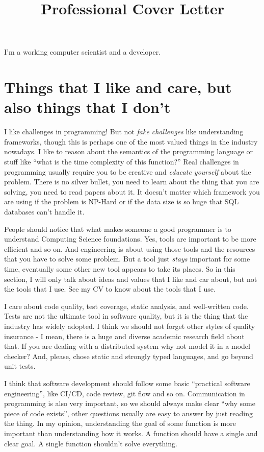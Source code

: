 \documentclass[11pt,a4paper,sans]{moderncv}
\title{Professional Cover Letter}
\begin{document}
\makecvtitle %
I'm a working computer scientist and a developer.

\section{Things that I like and care, but also things that I don't}
I like challenges in programming! But not \textit{fake challenges}
like understanding frameworks, though this is perhaps one of the most
valued things in the industry nowadays.  I like to reason about the
semantics of the programming language or stuff like ``what is the time
complexity of this function?''  Real challenges in programming usually
require you to be creative and \textit{educate yourself} about the
problem.  There is no silver bullet, you need to learn about the thing
that you are solving, you need to read papers about it. It doesn't matter
which framework you are using if the problem is NP-Hard or if the 
data size is so huge that SQL databases can't handle it.

People should notice that what makes someone a good programmer is to
understand Computing Science foundations.  Yes, tools are important to
be more efficient and so on.  And engineering is about using those
tools and the resources that you have to solve some problem.  But a
tool just \textit{stays} important for some time, eventually some other
new tool appears to take its places.  So in this section, I will only
talk about ideas and values that I like and car about, but not the
tools that I use.  See my CV to know about the tools that I use.

I care about code quality, test coverage, static analysis, and
well-written code. Tests are not the ultimate tool in software
quality, but it is the thing that the industry has widely adopted. I
think we should not forget other styles of quality insurance - I mean,
there is a huge and diverse academic research field about that.  If
you are dealing with a distributed system why not model it in a model
checker? And, please, chose static and strongly typed languages, and
go beyond unit tests.

I think that software development should follow some basic ``practical
software engineering'', like CI/CD, code review, git flow and so on.
Communication in programming is also very important, so we should
always make clear ``why some piece of code exists'', other questions
usually are easy to answer by just reading the thing. In my opinion,
understanding the goal of some function is more important than
understanding how it works. A function should have a single and clear
goal. A single function shouldn't solve everything.
\end{document}
